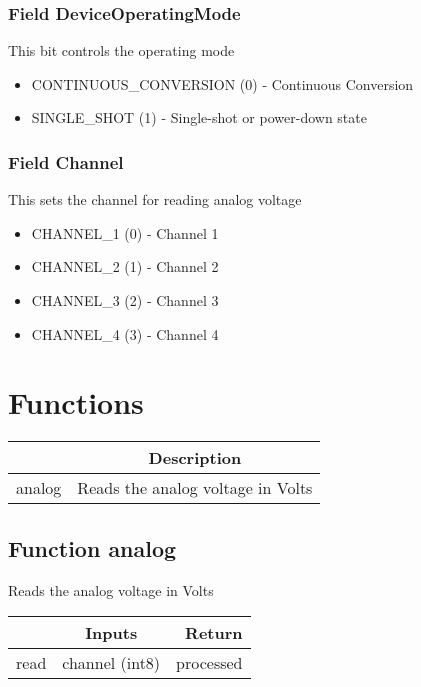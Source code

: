 \documentclass[a4paper,12pt,oneside,pdflatex,italian,final,twocolumn]{article}
\begin{document}
\raggedright

\subsubsection{Field DeviceOperatingMode }

This bit controls the operating mode


\begin{itemize}
\item CONTINUOUS\_CONVERSION (0) - Continuous Conversion
\item SINGLE\_SHOT (1) - Single-shot or power-down state
\end{itemize}


\raggedright

\subsubsection{Field Channel }

This sets the channel for reading analog voltage


\begin{itemize}
\item CHANNEL\_1 (0) - Channel 1
\item CHANNEL\_2 (1) - Channel 2
\item CHANNEL\_3 (2) - Channel 3
\item CHANNEL\_4 (3) - Channel 4
\end{itemize}





\raggedright


\section{Functions}

\centering
\begin{tabular}{lc}
\toprule
  & Description \\
\midrule
analog & Reads the analog voltage in Volts \\
\bottomrule
\end{tabular}


\raggedright
\subsection{Function analog }
Reads the analog voltage in Volts \\

\centering
\begin{tabular}{lcr}
\toprule
  & Inputs & Return \\
\midrule
read &
channel (int8)

&
processed
\\
\bottomrule
\end{tabular}



\raggedright
\end{document}
